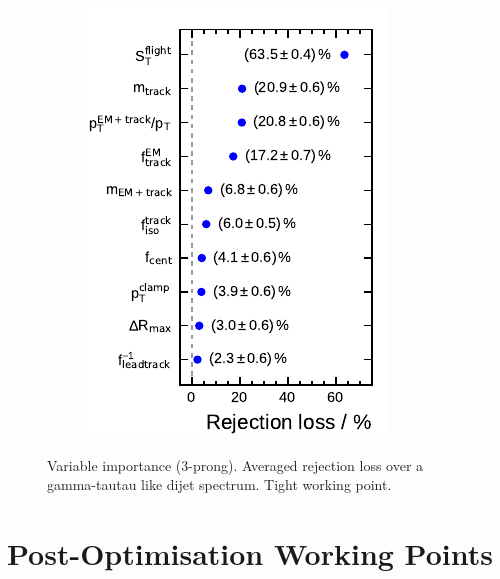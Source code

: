\begin{figure}[htb]
\begin{subfigure}[t]{0.32\textwidth}
  \end{subfigure}
  \begin{subfigure}[t]{0.32\textwidth}
    \centering
    \includegraphics{./figures/bdt_perf/var_importance/3p_iter3.pdf}
  \end{subfigure}

  \caption{Variable importance (3-prong). Averaged rejection loss over a
    gamma-tautau like dijet spectrum. Tight working point.}
  \label{fig:variable_importance_3p_app}
\end{figure}

\clearpage
\section{Post-Optimisation Working Points}
\label{app:bdt_working_point_rejection}

